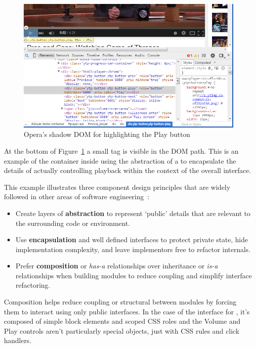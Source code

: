 \begin{figure}[htb]
\centerline{\includegraphics[width=6in]{images/html5_video_control.png}} 
\caption{Opera's shadow DOM for  highlighting the Play button}
\label{f:html5video}
\end{figure}

At the bottom of Figure~\ref{f:html5video} a small  tag is visible in the DOM path.
This is an example of the container inside  using the abstraction of a  to encapsulate the details of actually controlling playback within the context of the overall  interface.

This example illustrates three component design principles that are widely followed in other areas of software engineering~\cite{fowler2012}:
\begin{itemize}
\item Create layers of \textbf{abstraction} to represent `public' details that are relevant to the surrounding code or environment.
\item Use \textbf{encapsulation} and well defined interfaces to protect private state, hide implementation complexity, and leave implementors free to refactor internals.
\item Prefer \textbf{composition} or \textit{has-a} relationships over inheritance or \textit{is-a} relationships when building modules to reduce coupling and simplify interface refactoring.
\end{itemize}

Composition helps reduce coupling or structural between modules by forcing them to interact using only public interfaces.
In the case of the interface for , it's composed of simple block elements and scoped CSS roles and the Volume and Play controls aren't particularly special objects, just  with CSS rules and click handlers.

